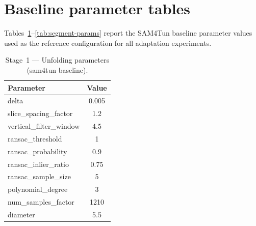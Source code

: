 
\FloatBarrier
\appendix

\section{Baseline parameter tables}\label{app:params}
Tables~\ref{tab:unfold-params}--\ref{tab:segment-params} report the SAM4Tun baseline parameter values used as the reference configuration for all adaptation experiments.

\begin{table}[ht]
\caption{Stage~1 --- Unfolding parameters (sam4tun baseline).}\label{tab:unfold-params}
\begin{tabular*}{\tblwidth}{@{} l c @{}}
\toprule
Parameter & Value \\
\midrule
delta & 0.005 \\
slice\_spacing\_factor & 1.2 \\
vertical\_filter\_window & 4.5 \\
ransac\_threshold & 1 \\
ransac\_probability & 0.9 \\
ransac\_inlier\_ratio & 0.75 \\
ransac\_sample\_size & 5 \\
polynomial\_degree & 3 \\
num\_samples\_factor & 1210 \\
diameter & 5.5 \\
\bottomrule
\end{tabular*}
\end{table}

